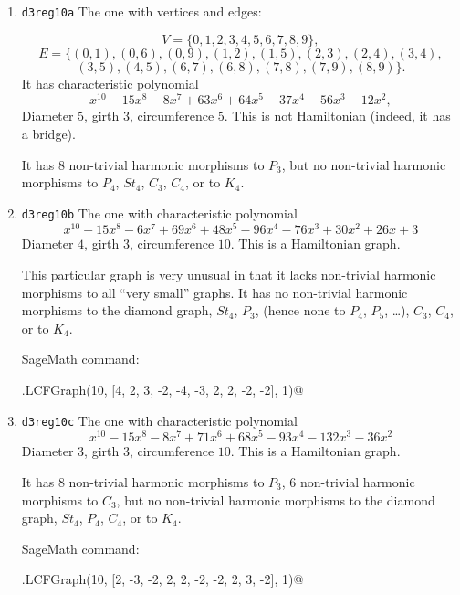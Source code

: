 \documentclass[12pt,letterpaper]{article}
\theoremstyle{definition}
\begin{document}
\begin{enumerate}
\item
  {\tt d3reg10a}\newline
The one with vertices and edges:

\[
V=\{ 0, 1, 2, 3, 4, 5, 6, 7, 8, 9\},
\]
\[
E = \{ (0, 1), (0, 6), (0, 9), (1, 2), (1, 5), (2, 3), (2, 4), (3, 4),
\]
\[
(3, 5), (4, 5), (6, 7), (6, 8), (7, 8), (7, 9), (8, 9)\}.
\]
It has %
characteristic polynomial  
\[
x^{10} - 15x^8 - 8x^7 + 63x^6 + 64x^5 - 37x^4 - 56x^3 - 12x^2,
\]
Diameter $5$,
girth $3$,
circumference $5$.
This is not Hamiltonian (indeed, it has a bridge).

It has $8$ non-trivial harmonic morphisms to $P_3$, but
no non-trivial harmonic morphisms to $P_4$, $St_4$, $C_3$, $C_4$, or to $K_4$.


\item
  {\tt d3reg10b}\newline
The one with characteristic polynomial  
\[
x^{10} - 15x^8 - 6x^7 + 69x^6 + 48x^5 - 96x^4 - 76x^3 + 30x^2 + 26x + 3
\]
Diameter $4$,
girth $3$,
circumference $10$.
This is a Hamiltonian graph.

This particular graph is very unusual in that it lacks non-trivial
harmonic morphisms to all ``very small'' graphs.
It has no non-trivial harmonic morphisms to the diamond graph,
$St_4$, $P_3$, (hence none to $P_4$, $P_5$, \dots),
$C_3$, $C_4$, or to $K_4$.

SageMath command:

\verb@graphs.LCFGraph(10, [4, 2, 3, -2, -4, -3, 2, 2, -2, -2], 1)@


\item
  {\tt d3reg10c}\newline
The one with %
characteristic polynomial  
\[
x^{10} - 15x^8 - 8x^7 + 71x^6 + 68x^5 - 93x^4 - 132x^3 - 36x^2 
\]
Diameter $3$,
girth $3$,
circumference $10$.
This is a Hamiltonian graph.%

It has $8$ non-trivial harmonic morphisms to $P_3$,
$6$ non-trivial harmonic morphisms to $C_3$,
but no non-trivial harmonic morphisms to the diamond graph,
$St_4$, $P_4$, $C_4$, or to $K_4$.

SageMath command:

\verb@graphs.LCFGraph(10, [2, -3, -2, 2, 2, -2, -2, 2, 3, -2], 1)@



\end{enumerate}
\end{document}
